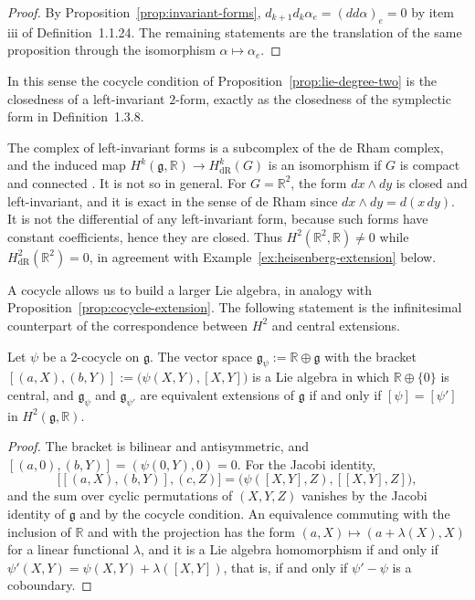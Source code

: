 \begin{proof}
	By Proposition~\ref{prop:invariant-forms}, $d_{k+1}d_k\alpha_e=(dd\alpha)_e=0$ by item iii of Definition~1.1.24. The remaining statements are the translation of the same proposition through the isomorphism $\alpha\mapsto\alpha_e$.
\end{proof}

\noindent In this sense the cocycle condition of Proposition~\ref{prop:lie-degree-two} is the closedness of a left-invariant $2$-form, exactly as the closedness of the symplectic form in Definition~1.3.8.

\begin{remark}\label{rem:chevalley-eilenberg}
	The complex of left-invariant forms is a subcomplex of the de Rham complex, and the induced map $H^k(\mathfrak{g},\mathbb{R})\to H^k_{\mathrm{dR}}(G)$ is an isomorphism if $G$ is compact and connected \cite[TODO-location]{TODO-ChevalleyEilenberg1948}. It is not so in general. For $G=\mathbb{R}^2$, the form $dx\wedge dy$ is closed and left-invariant, and it is exact in the sense of de Rham since $dx\wedge dy=d(x\,dy)$. It is not the differential of any left-invariant form, because such forms have constant coefficients, hence they are closed. Thus $H^2(\mathbb{R}^2,\mathbb{R})\neq0$ while $H^2_{\mathrm{dR}}(\mathbb{R}^2)=0$, in agreement with Example~\ref{ex:heisenberg-extension} below.
\end{remark}

A cocycle allows us to build a larger Lie algebra, in analogy with Proposition~\ref{prop:cocycle-extension}. The following statement is the infinitesimal counterpart of the correspondence between $H^2$ and central extensions.

\begin{proposition}\label{prop:lie-extension}
	Let $\psi$ be a $2$-cocycle on $\mathfrak{g}$. The vector space $\mathfrak{g}_\psi:=\mathbb{R}\oplus\mathfrak{g}$ with the bracket $[(a,X),(b,Y)]:=\big(\psi(X,Y),[X,Y]\big)$ is a Lie algebra in which $\mathbb{R}\oplus\{0\}$ is central, and $\mathfrak{g}_\psi$ and $\mathfrak{g}_{\psi'}$ are equivalent extensions of $\mathfrak{g}$ if and only if $[\psi]=[\psi']$ in $H^2(\mathfrak{g},\mathbb{R})$.
\end{proposition}

\begin{proof}
	The bracket is bilinear and antisymmetric, and $[(a,0),(b,Y)]=(\psi(0,Y),0)=0$. For the Jacobi identity,
	\begin{equation*}
		\big[[(a,X),(b,Y)],(c,Z)\big]=\big(\psi([X,Y],Z),[[X,Y],Z]\big),
	\end{equation*}
	and the sum over cyclic permutations of $(X,Y,Z)$ vanishes by the Jacobi identity of $\mathfrak{g}$ and by the cocycle condition. An equivalence commuting with the inclusion of $\mathbb{R}$ and with the projection has the form $(a,X)\mapsto(a+\lambda(X),X)$ for a linear functional $\lambda$, and it is a Lie algebra homomorphism if and only if $\psi'(X,Y)=\psi(X,Y)+\lambda([X,Y])$, that is, if and only if $\psi'-\psi$ is a coboundary.
\end{proof}

